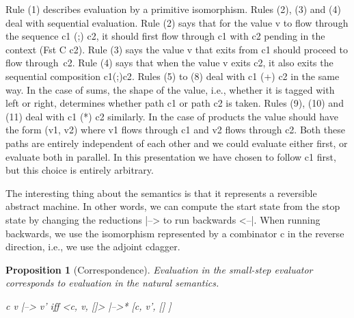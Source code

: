\documentclass[preprint]{sigplanconf}
\newtheorem{proposition}[theorem]{Proposition}
\begin{document}
\begin{scriptsize}
\end{scriptsize}
Rule (1) describes evaluation by a primitive isomorphism. Rules (2), (3) and
(4) deal with sequential evaluation. Rule (2) says that for the value {{v}}
to flow through the sequence {{c1 (;) c2}}, it should first flow through
{{c1}} with {{c2}} pending in the context ({{Fst C c2}}). Rule (3) says the
value {{v}} that exits from {{c1}} should proceed to flow
through~{{c2}}. Rule (4) says that when the value {{v}} exits {{c2}}, it also
exits the sequential composition {{c1(;)c2}}. Rules (5) to (8) deal with 
{{c1 (+) c2}} in the same way. In the case of sums, the shape of the value,
i.e., whether it is tagged with {{left}} or {{right}}, determines whether
path {{c1}} or path {{c2}} is taken. Rules (9), (10) and (11) deal with 
{{c1 (*) c2}} similarly. In the case of products the value should have the
form {{(v1, v2)}} where {{v1}} flows through {{c1}} and {{v2}} flows through
{{c2}}. Both these paths are entirely independent of each other and we could
evaluate either first, or evaluate both in parallel. In this presentation we
have chosen to follow {{c1}} first, but this choice is entirely arbitrary.

The interesting thing about the semantics is that it represents a reversible
abstract machine. In other words, we can compute the start state from the
stop state by changing the reductions {{|-->}} to run backwards
{{<--|}}. When running backwards, we use the isomorphism represented by a
combinator {{c}} in the reverse direction, i.e., we use the adjoint
{{c{dagger}}}.

\begin{proposition}[Correspondence]
  Evaluation in the small-step evaluator corresponds to evaluation in
  the natural semantics.

  {{c v |--> v'}} iff {{<c, v, []> |-->* [c, v', [] ]}}

\end{proposition}
\end{document}
